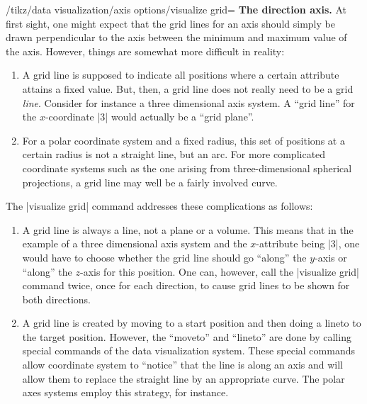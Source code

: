 \begin{key}{/tikz/data visualization/axis options/visualize grid=}
    \medskip
    \textbf{The direction axis.}
    At first sight, one might expect that the grid lines for an axis should
    simply be drawn perpendicular to the axis between the minimum and maximum
    value of the axis. However, things are somewhat more difficult in reality:
    \begin{enumerate}
        \item A grid line is supposed to indicate all positions where a certain
            attribute attains a fixed value. But, then, a grid line does not
            really need to be a grid \emph{line}. Consider for instance a three
            dimensional axis system. A ``grid line'' for the $x$-coordinate |3|
            would actually be a ``grid plane''.
        \item For a polar coordinate  system and a fixed radius, this set of
            positions at a certain radius is not a straight line, but an arc.
            For more complicated coordinate systems such as the one arising
            from three-dimensional spherical projections, a grid line may well
            be a fairly involved curve.
    \end{enumerate}
    The |visualize grid| command addresses these complications as follows:
    \begin{enumerate}
        \item A grid line is always a line, not a plane or a volume. This means
            that in the example of a three dimensional axis system and the
            $x$-attribute being |3|, one would have to choose whether the grid
            line should go ``along'' the $y$-axis or ``along'' the $z$-axis for
            this position. One can, however, call the |visualize grid| command
            twice, once for each direction, to cause grid lines to be shown for
            both directions.
        \item A grid line is created by moving to a start position and then
            doing a lineto to the target position. However, the ``moveto'' and
            ``lineto'' are done by calling special commands of the data
            visualization system. These special commands allow coordinate
            system to ``notice'' that the line is along an axis and will allow
            them to replace the straight line by an appropriate curve. The
            polar axes systems employ this strategy, for instance.
    \end{enumerate}


\end{key}
